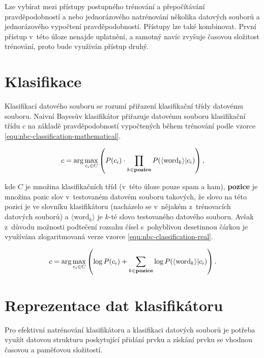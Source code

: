 \documentclass[a4paper, 12pt]{report}
\begin{document}
Lze vybírat mezi přístupy postupného trénování a přepočítávání 
pravděpodobností a nebo jednorázového natrénování několika datových 
souborů a jednorázového vypočtení pravděpodobností. Přístupy lze také 
kombinovat. První přístup v~této úloze nenajde uplatnění, a samotný navíc 
zvyšuje časovou složitost trénování, proto bude využíván přístup druhý.

\section{Klasifikace}
\label{text:analysis-nbc-classify}

Klasifikací datového souboru se rozumí přiřazení klasifikační třídy 
datovému souboru. Naivní Bayesův klasifikátor přiřazuje datovému souboru 
klasifikační třídu $c$ na základě pravděpodobností vypočtených během 
trénování podle vzorce \ref{equ:nbc-classification-mathematical}.

\begin{equation}
    c = \arg\max_{c_i \in C} \left( P(c_i) \cdot \prod_{k \in 
\text{\textbf{pozice}}} P(\langle \text{word}_k \rangle|c_i) \right),
    \label{equ:nbc-classification-mathematical}
\end{equation}

kde $C$ je množina klasifikačních tříd (v~této úloze pouze spam a ham), 
\textbf{pozice} je množina pozic slov v~testovaném datovém souboru 
takových, že slovo na této pozici je ve slovníku klasifikátoru (nacházelo 
se v~nějakém z~trénovacích datových souborů) a $\langle \text{word}_k 
\rangle$ je $k$-té slovo testovaného datového souboru. Avšak z~důvodu 
možnosti podtečení rozsahu čísel s~pohyblivou desetinnou čárkou je 
využívána zlogaritmovaná verze vzorce \ref{equ:nbc-classification-real}.

\begin{equation}
    c = \arg\max_{c_i \in C} \left( \log P(c_i) + \sum_{k \in 
\text{\textbf{pozice}}} \log P(\langle \text{word}_k \rangle|c_i) \right).
    \label{equ:nbc-classification-real}
\end{equation}

\section{Reprezentace dat klasifikátoru}

Pro efektivní natrénování klasifikátoru a klasifikaci datových souborů je 
potřeba využít datovou strukturu poskytující přidání prvku a získání prvku 
se vhodnou časovou a paměťovou složitostí.
\end{document}
